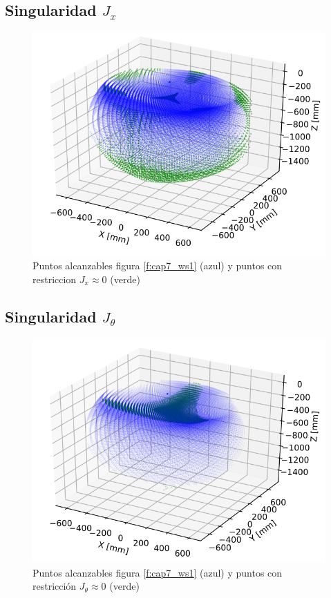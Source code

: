    \newpage
    
    \subsection{Singularidad $J_{x}$}
        \begin{figure}[h]
            \centering
            \includegraphics[width=0.65\linewidth]{Main/Chapter7/Images7/ws_4.png}
            \caption{Puntos alcanzables figura \eqref{f:cap7_ws1} (azul) y puntos con restriccion $J_{x}\approx0$ (verde) }
            \label{f:cap7_ws4}
        \end{figure}  
    
    \subsection{Singularidad $J_{\theta}$}
        \begin{figure}[h]
            \centering
            \includegraphics[width=0.65\linewidth]{Main/Chapter7/Images7/ws_5.png}
            \caption{Puntos alcanzables figura \eqref{f:cap7_ws1} (azul) y puntos con restricción $J_{\theta}\approx0$ (verde) }
            \label{f:cap7_ws5}
        \end{figure}  
        

